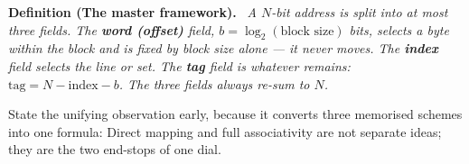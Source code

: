 \documentclass[11pt]{article}
\newenvironment{definitionbox}[1]{\par\noindent\textbf{Definition (#1).}\ \itshape}{\par\vspace{0.3em}}
\begin{document}
\begin{definitionbox}{The master framework}
A $N$-bit address is split into at most three fields. The \textbf{word (offset)} field, $b = \log_2(\text{block size})$ bits, selects a byte within the block and is fixed by block size alone --- it never moves. The \textbf{index} field selects the line or set. The \textbf{tag} field is whatever remains: $\text{tag} = N - \text{index} - b$. The three fields always re-sum to $N$.
\end{definitionbox}

State the unifying observation early, because it converts three memorised schemes into one formula:  Direct mapping and full associativity are not separate ideas; they are the two end-stops of one dial.
\end{document}
